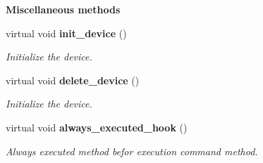\begin{Indent}{\bf Miscellaneous methods}\par
\begin{CompactItemize}
\item 
virtual void {\bf init\_\-device} ()
\begin{CompactList}\small\item\em Initialize the device.\item\end{CompactList}\item 
virtual void {\bf delete\_\-device} ()
\begin{CompactList}\small\item\em Initialize the device.\item\end{CompactList}\item 
virtual void {\bf always\_\-executed\_\-hook} ()
\begin{CompactList}\small\item\em Always executed method befor execution command method.\item\end{CompactList}\end{CompactItemize}
\end{Indent}

